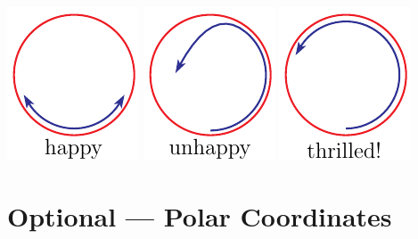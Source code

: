 \begin{efig}
\begin{center}
    \includegraphics{skateA.pdf} \qquad\quad
    \includegraphics{skateB.pdf} \qquad\quad
    \includegraphics{skateC.pdf} 
\end{center}
\end{efig}

\section{Optional --- Polar Coordinates}\label{sec:polar}

